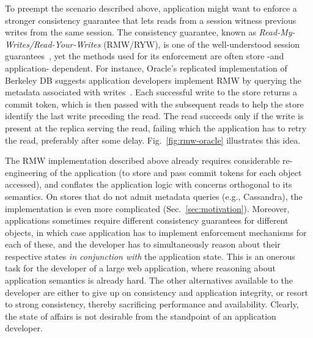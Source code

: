 To preempt the scenario described above, application might want to
enforce a stronger consistency guarantee that lets reads from a
session witness previous writes from the same session. The consistency
guarantee, known as \emph{Read-My-Writes/Read-Your-Writes} (RMW/RYW),
is one of the well-understood session guarantees~\cite{terry-pdis94},
yet the methods used for its enforcement are often store -and
application- dependent. For instance, Oracle's replicated
implementation of Berkeley DB suggests application developers implement
RMW by querying the metadata associated with writes~\cite{oracle-ryw}.
Each successful write to the store returns a commit token, which is
then passed with the subsequent reads to help the store identify the
last write preceding the read. The read succeeds only if the write is
present at the replica serving the read, failing which the application
has to retry the read, preferably after some delay.
Fig.~\ref{fig:rmw-oracle} illustrates this idea.

The RMW implementation described above already requires considerable
re-engineering of the application (to store and pass commit tokens for
each object accessed), and conflates the application logic with
concerns orthogonal to its semantics. On stores that do not admit
metadata queries (e.g., Cassandra), the implementation is even more
complicated (Sec.~\ref{sec:motivation}). Moreover, applications
sometimes require different consistency guarantees for different
objects, in which case application has to implement enforcement
mechanisms for each of these, and the developer has to simultaneously
reason about their respective states \emph{in conjunction with} the
application state. This is an onerous task for the developer of a
large web application, where reasoning about application semantics is
already hard. The other alternatives available to the developer are
either to give up on consistency and application integrity, or resort
to strong consistency, thereby sacrificing performance and
availability. Clearly, the state of affairs is not desirable from the
standpoint of an application developer.

